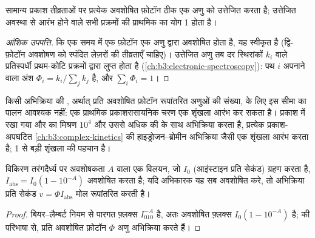 \begin{proposition}[स्टार्क--आइंस्टाइन नियम]\label{prop:b3:photochemistry:stark-einstein}
सामान्य प्रकाश तीव्रताओं पर प्रत्येक अवशोषित फ़ोटॉन ठीक एक अणु को
उत्तेजित करता है; उत्तेजित अवस्था से आरंभ होने वाले सभी प्रक्रमों की प्राथमिक  का योग 1 होता है।
\end{proposition}

\begin{proof}[आंशिक उपपत्ति]
कि एक समय में एक फ़ोटॉन एक अणु द्वारा अवशोषित होता है, यह स्वीकृत है (द्वि-फ़ोटॉन
अवशोषण को स्पंदित लेज़रों की तीव्रताएँ चाहिए)। उत्तेजित अणु तब दर स्थिरांकों $k_i$ वाले प्रतिस्पर्धी
प्रथम-कोटि प्रक्रमों द्वारा लुप्त होता है
(\cref{ch:b3:electronic-spectroscopy}): पथ $i$ अपनाने वाला अंश $\Phi_i =
k_i/\sum_jk_j$ है, और $\sum_i\Phi_i = 1$।
\end{proof}

किसी अभिक्रिया की , अर्थात् प्रति अवशोषित फ़ोटॉन रूपांतरित अणुओं की संख्या,
के लिए इस सीमा का पालन आवश्यक नहीं: एक प्राथमिक प्रकाशरासायनिक चरण एक शृंखला आरंभ कर सकता है।
प्रकाश में रखा गया  और  का मिश्रण $10^4$ और उससे अधिक की  के साथ
अभिक्रिया करता है, प्रत्येक प्रकाश-अपघटित  \cref{ch:b3:complex-kinetics} की
हाइड्रोजन--ब्रोमीन अभिक्रिया जैसी एक शृंखला आरंभ करता है; 1 से बड़ी 
शृंखला की पहचान है।

\begin{proposition}[प्रकाशरासायनिक अभिक्रिया की दर]\label{prop:b3:photochemistry:rate}
विकिरण तरंगदैर्ध्य पर अवशोषकता $A$ वाला एक विलयन, जो  $I_0$ (आइंस्टाइन प्रति सेकंड) ग्रहण करता है, $I_{\mathrm{abs}} = I_0(1 - 10^{-A})$ अवशोषित करता है; यदि
अभिकारक यह सब अवशोषित करे, तो अभिक्रिया प्रति सेकंड $v = \Phi I_{\mathrm{abs}}$ मोल रूपांतरित करती है।
\end{proposition}

\begin{proof}
बियर--लैम्बर्ट नियम से पारगत फ़्लक्स $I_010^{-A}$ है, अतः अवशोषित फ़्लक्स
$I_0(1 - 10^{-A})$ है;  की परिभाषा से, प्रति अवशोषित फ़ोटॉन $\Phi$ अणु
अभिक्रिया करते हैं।
\end{proof}

